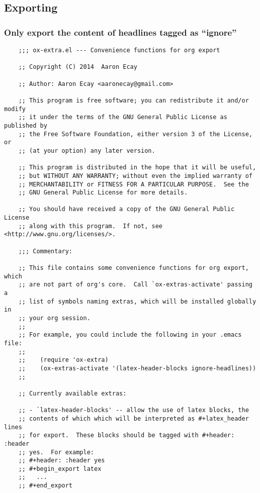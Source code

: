 \documentclass[11pt]{article}
\begin{document}
\subsection{Exporting}
\label{sec:org3be3e5b}

\subsubsection{Only export the content of headlines tagged as ``ignore''}
\label{sec:org8934a2a}
\begin{verbatim}
    ;;; ox-extra.el --- Convenience functions for org export

    ;; Copyright (C) 2014  Aaron Ecay

    ;; Author: Aaron Ecay <aaronecay@gmail.com>

    ;; This program is free software; you can redistribute it and/or modify
    ;; it under the terms of the GNU General Public License as published by
    ;; the Free Software Foundation, either version 3 of the License, or
    ;; (at your option) any later version.

    ;; This program is distributed in the hope that it will be useful,
    ;; but WITHOUT ANY WARRANTY; without even the implied warranty of
    ;; MERCHANTABILITY or FITNESS FOR A PARTICULAR PURPOSE.  See the
    ;; GNU General Public License for more details.

    ;; You should have received a copy of the GNU General Public License
    ;; along with this program.  If not, see <http://www.gnu.org/licenses/>.

    ;;; Commentary:

    ;; This file contains some convenience functions for org export, which
    ;; are not part of org's core.  Call `ox-extras-activate' passing a
    ;; list of symbols naming extras, which will be installed globally in
    ;; your org session.
    ;;
    ;; For example, you could include the following in your .emacs file:
    ;;
    ;;    (require 'ox-extra)
    ;;    (ox-extras-activate '(latex-header-blocks ignore-headlines))
    ;;

    ;; Currently available extras:

    ;; - `latex-header-blocks' -- allow the use of latex blocks, the
    ;; contents of which which will be interpreted as #+latex_header lines
    ;; for export.  These blocks should be tagged with #+header: :header
    ;; yes.  For example:
    ;; #+header: :header yes
    ;; #+begin_export latex
    ;;   ...
    ;; #+end_export


\end{verbatim}
\end{document}
